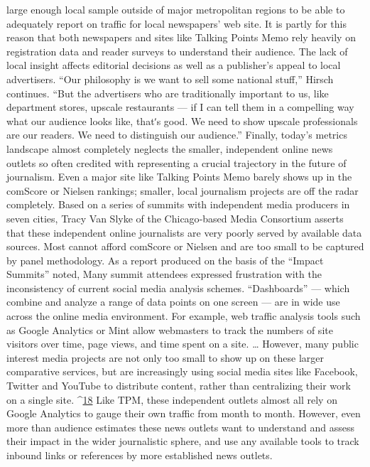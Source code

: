 large enough local sample outside of major metropolitan regions to be
able to adequately report on traffic for local newspapers’ web site. It is
partly for this reason that both newspapers and sites like Talking Points
Memo rely heavily on registration data and reader surveys to understand
their audience.
The lack of local insight affects editorial decisions as well as a publisher’s
appeal to local advertisers. ``Our philosophy is we want to sell some
national stuff,'' Hirsch continues. ``But the advertisers who are
traditionally important to us, like department stores, upscale restaurants
— if I can tell them in a compelling way what our audience looks like,
thatʹs good. We need to show upscale professionals are our readers. We
need to distinguish our audience.''
Finally, today’s metrics landscape almost completely neglects the smaller,
independent online news outlets so often credited with representing a
crucial trajectory in the future of journalism. Even a major site like Talking
Points Memo barely shows up in the comScore or Nielsen rankings;
smaller, local journalism projects are off the radar completely.
Based on a series of summits with independent media producers in seven
cities, Tracy Van Slyke of the Chicago‐based Media Consortium asserts
that these independent online journalists are very poorly served by
available data sources. Most cannot afford comScore or Nielsen and are
too small to be captured by panel methodology. As a report produced on
the basis of the ``Impact Summits'' noted,
Many summit attendees expressed frustration with the
inconsistency of current social media analysis schemes.
``Dashboards'' — which combine and analyze a range of data
points on one screen — are in wide use across the online media
environment. For example, web traffic analysis tools such as
Google Analytics or Mint allow webmasters to track the numbers of
site visitors over time, page views, and time spent on a site. \ldots 
However, many public interest media projects are not only too
small to show up on these larger comparative services, but are
increasingly using social media sites like Facebook, Twitter and
YouTube to distribute content, rather than centralizing their work
on a single site. ^{\href{#endnotes}{18}}
Like TPM, these independent outlets almost all rely on Google Analytics
to gauge their own traffic from month to month. However, even more
than audience estimates these news outlets want to understand and assess
their impact in the wider journalistic sphere, and use any available tools to
track inbound links or references by more established news outlets.

